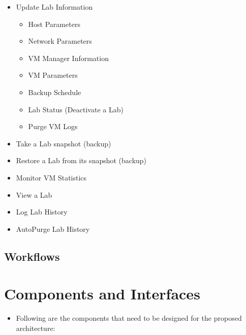 \documentclass[11pt]{article}
\begin{document}
\begin{itemize}
\item Update Lab Information\\
\label{sec-3.4.7}

\begin{itemize}
\item Host Parameters
\item Network Parameters
\item VM Manager Information
\item VM Parameters
\item Backup Schedule
\item Lab Status (Deactivate a Lab)
\item Purge VM Logs
\end{itemize}

\item Take a Lab snapshot (backup)\\
\label{sec-3.4.8}


\item Restore a Lab from its snapshot (backup)\\
\label{sec-3.4.9}


\item Monitor VM Statistics\\
\label{sec-3.4.10}


\item View a Lab\\
\label{sec-3.4.11}


\item Log Lab History\\
\label{sec-3.4.12}


\item AutoPurge Lab History\\
\label{sec-3.4.13}


     
\end{itemize} %
\subsection{Workflows}
\label{sec-3.4}

\section{Components and Interfaces}
\label{sec-4}

\begin{itemize}
\item Following are the components that need to be designed for the proposed architecture:
\end{itemize}
\end{document}
